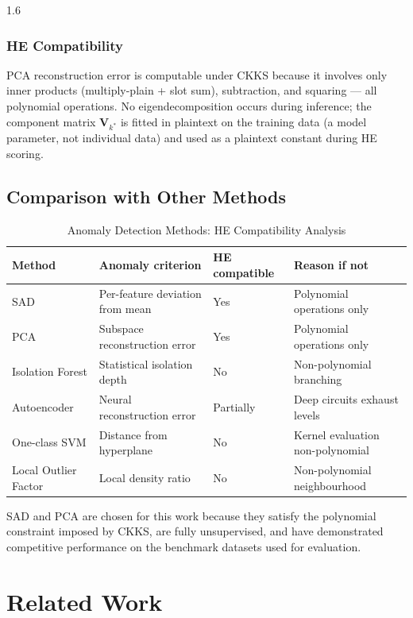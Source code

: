 \begin{spacing}{1.6}
\subsubsection{HE Compatibility}

PCA reconstruction error is computable under CKKS because it involves only
inner products (multiply-plain + slot sum), subtraction, and squaring ---
all polynomial operations. No eigendecomposition occurs during inference;
the component matrix $\mathbf{V}_{k^*}$ is fitted in plaintext on the training
data (a model parameter, not individual data) and used as a plaintext constant
during HE scoring.

\subsection{Comparison with Other Methods}

\begin{table}[H]
\centering
\caption{Anomaly Detection Methods: HE Compatibility Analysis}
\label{tab:methods}
\begin{tabular}{p{2.5cm}p{3cm}p{2cm}p{3cm}}
\toprule
\textbf{Method} & \textbf{Anomaly criterion} & \textbf{HE compatible} & \textbf{Reason if not} \\
\midrule
SAD & Per-feature deviation from mean & Yes & Polynomial operations only \\
PCA & Subspace reconstruction error & Yes & Polynomial operations only \\
Isolation Forest & Statistical isolation depth & No & Non-polynomial branching \\
Autoencoder & Neural reconstruction error & Partially & Deep circuits exhaust levels \\
One-class SVM & Distance from hyperplane & No & Kernel evaluation non-polynomial \\
Local Outlier Factor & Local density ratio & No & Non-polynomial neighbourhood \\
\bottomrule
\end{tabular}
\end{table}

SAD and PCA are chosen for this work because they satisfy the polynomial
constraint imposed by CKKS, are fully unsupervised, and have demonstrated
competitive performance on the benchmark datasets used for evaluation.

\section{Related Work}


\end{spacing}
